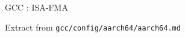 \begin{Frame}{GCC : ISA-FMA}
  \begin{block}{Extract from \texttt{gcc/config/aarch64/aarch64.md}}\small
    
  \end{block}
\end{Frame}
